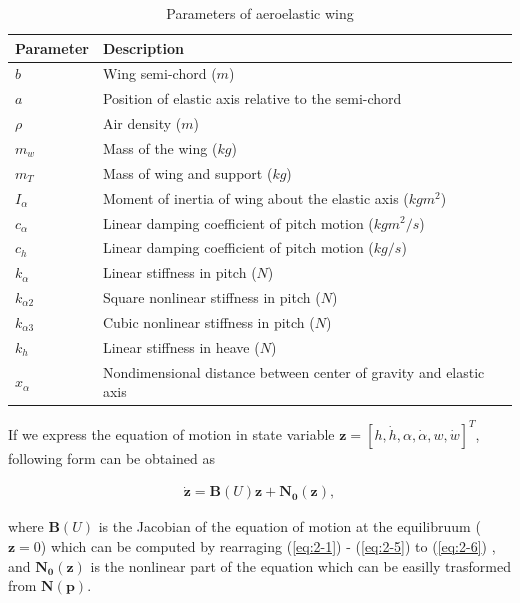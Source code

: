 \documentclass[openacc]{rsproca_new}%
\def\vec#1{\ensuremath{\mathbf{#1}}}
\newcommand{\Eref}[1]{(\ref{#1})}
\begin{document}
\begin{table}[!ht]
\caption{Parameters of aeroelastic wing}
\label{wing_par}
\begin{tabular}{ll}%
\hline
Parameter &Description \\
\hline
$b$ & Wing semi-chord ($m$) \\
$a$ & Position of elastic axis relative to the semi-chord  \\
$\rho$ & Air density ($m$) \\
$m_w$ & Mass of the wing ($kg$) \\
$m_T$ & Mass of wing and support ($kg$) \\
$I_\alpha$ & Moment of inertia of wing about the elastic axis ($kg m^2$) \\
$c_\alpha$ & Linear damping coefficient of pitch motion ($kg m^2/s$) \\
$c_h$ & Linear damping coefficient of pitch motion ($kg/s$) \\
$k_\alpha$ & Linear stiffness in pitch ($N$) \\
$k_{\alpha 2}$ & Square nonlinear stiffness in pitch  ($N$) \\
$k_{\alpha 3}$ & Cubic nonlinear stiffness in pitch ($N$) \\
$k_{h}$ & Linear stiffness in heave ($N$) \\
$x_\alpha$ & Nondimensional distance between center of gravity and elastic axis  \\
\hline
\end{tabular}
\vspace*{-4pt}
\end{table}%

\noindent If we express the equation of motion in state variable $ \vec{z} = [h, \dot h, \alpha, \dot \alpha, w, \dot {w}] ^T $, following form can be obtained as

\begin{align}\label{eq:2-6}
\dot{\vec{z}}= \vec{B}(U)\vec{z}+\vec{N_0}(\vec{z}),
\end{align}

\noindent where $\vec{B}(U)$ is the Jacobian of the equation of motion at the equilibruum ($\vec z=0$) which can be computed by rearraging \Eref{eq:2-1} - \Eref{eq:2-5} to \Eref{eq:2-6}
, and $\vec{N_0}(\vec{z})$ is the nonlinear part of the equation which can be easilly trasformed from $\vec{N}(\vec{p})$.
\end{document}
